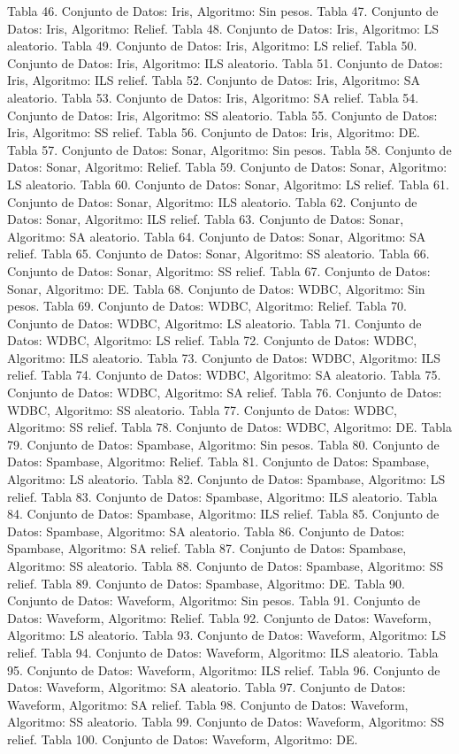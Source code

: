 \documentclass{ci5652}
\begin{document}
Tabla 46. Conjunto de Datos: Iris, Algoritmo: Sin pesos.
Tabla 47. Conjunto de Datos: Iris, Algoritmo: Relief.
Tabla 48. Conjunto de Datos: Iris, Algoritmo: LS aleatorio.
Tabla 49. Conjunto de Datos: Iris, Algoritmo: LS relief.
Tabla 50. Conjunto de Datos: Iris, Algoritmo: ILS aleatorio.
Tabla 51. Conjunto de Datos: Iris, Algoritmo: ILS relief.
Tabla 52. Conjunto de Datos: Iris, Algoritmo: SA aleatorio.
Tabla 53. Conjunto de Datos: Iris, Algoritmo: SA relief.
Tabla 54. Conjunto de Datos: Iris, Algoritmo: SS aleatorio.
Tabla 55. Conjunto de Datos: Iris, Algoritmo: SS relief.
Tabla 56. Conjunto de Datos: Iris, Algoritmo: DE.
Tabla 57. Conjunto de Datos: Sonar, Algoritmo: Sin pesos.
Tabla 58. Conjunto de Datos: Sonar, Algoritmo: Relief.
Tabla 59. Conjunto de Datos: Sonar, Algoritmo: LS aleatorio.
Tabla 60. Conjunto de Datos: Sonar, Algoritmo: LS relief.
Tabla 61. Conjunto de Datos: Sonar, Algoritmo: ILS aleatorio.
Tabla 62. Conjunto de Datos: Sonar, Algoritmo: ILS relief.
Tabla 63. Conjunto de Datos: Sonar, Algoritmo: SA aleatorio.
Tabla 64. Conjunto de Datos: Sonar, Algoritmo: SA relief.
Tabla 65. Conjunto de Datos: Sonar, Algoritmo: SS aleatorio.
Tabla 66. Conjunto de Datos: Sonar, Algoritmo: SS relief.
Tabla 67. Conjunto de Datos: Sonar, Algoritmo: DE.
Tabla 68. Conjunto de Datos: WDBC, Algoritmo: Sin pesos.
Tabla 69. Conjunto de Datos: WDBC, Algoritmo: Relief.
Tabla 70. Conjunto de Datos: WDBC, Algoritmo: LS aleatorio.
Tabla 71. Conjunto de Datos: WDBC, Algoritmo: LS relief.
Tabla 72. Conjunto de Datos: WDBC, Algoritmo: ILS aleatorio.
Tabla 73. Conjunto de Datos: WDBC, Algoritmo: ILS relief.
Tabla 74. Conjunto de Datos: WDBC, Algoritmo: SA aleatorio.
Tabla 75. Conjunto de Datos: WDBC, Algoritmo: SA relief.
Tabla 76. Conjunto de Datos: WDBC, Algoritmo: SS aleatorio.
Tabla 77. Conjunto de Datos: WDBC, Algoritmo: SS relief.
Tabla 78. Conjunto de Datos: WDBC, Algoritmo: DE.
Tabla 79. Conjunto de Datos: Spambase, Algoritmo: Sin pesos.
Tabla 80. Conjunto de Datos: Spambase, Algoritmo: Relief.
Tabla 81. Conjunto de Datos: Spambase, Algoritmo: LS aleatorio.
Tabla 82. Conjunto de Datos: Spambase, Algoritmo: LS relief.
Tabla 83. Conjunto de Datos: Spambase, Algoritmo: ILS aleatorio.
Tabla 84. Conjunto de Datos: Spambase, Algoritmo: ILS relief.
Tabla 85. Conjunto de Datos: Spambase, Algoritmo: SA aleatorio.
Tabla 86. Conjunto de Datos: Spambase, Algoritmo: SA relief.
Tabla 87. Conjunto de Datos: Spambase, Algoritmo: SS aleatorio.
Tabla 88. Conjunto de Datos: Spambase, Algoritmo: SS relief.
Tabla 89. Conjunto de Datos: Spambase, Algoritmo: DE.
Tabla 90. Conjunto de Datos: Waveform, Algoritmo: Sin pesos.
Tabla 91. Conjunto de Datos: Waveform, Algoritmo: Relief.
Tabla 92. Conjunto de Datos: Waveform, Algoritmo: LS aleatorio.
Tabla 93. Conjunto de Datos: Waveform, Algoritmo: LS relief.
Tabla 94. Conjunto de Datos: Waveform, Algoritmo: ILS aleatorio.
Tabla 95. Conjunto de Datos: Waveform, Algoritmo: ILS relief.
Tabla 96. Conjunto de Datos: Waveform, Algoritmo: SA aleatorio.
Tabla 97. Conjunto de Datos: Waveform, Algoritmo: SA relief.
Tabla 98. Conjunto de Datos: Waveform, Algoritmo: SS aleatorio.
Tabla 99. Conjunto de Datos: Waveform, Algoritmo: SS relief.
Tabla 100. Conjunto de Datos: Waveform, Algoritmo: DE.
\end{document}
